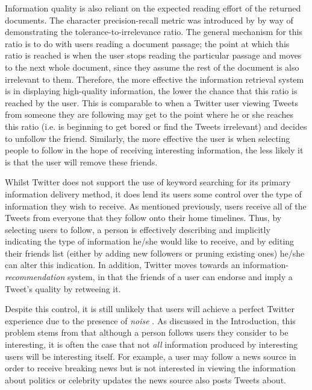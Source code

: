 Information quality is also reliant on the expected reading effort of the returned documents. The character precision-recall metric was introduced by \cite{arvola10} by way of demonstrating the tolerance-to-irrelevance ratio. The general mechanism for this ratio is to do with users reading a document passage; the point at which this ratio is reached is when the user stops reading the particular passage and moves to the next whole document, since they assume the rest of the document is also irrelevant to them. Therefore, the more effective the information retrieval system is in displaying high-quality information, the lower the chance that this ratio is reached by the user. This is comparable to when a Twitter user viewing Tweets from someone they are following may get to the point where he or she reaches this ratio (i.e. is beginning to get bored or find the Tweets irrelevant) and decides to unfollow the friend. Similarly, the more effective the user is when selecting people to follow in the hope of receiving interesting information, the less likely it is that the user will remove these friends.

Whilst Twitter does not support the use of keyword searching for its primary information delivery method, it does lend its users some control over the type of information they wish to receive. As mentioned previously, users receive all of the Tweets from everyone that they follow onto their home timelines. Thus, by selecting users to follow, a person is effectively describing and implicitly indicating the type of information he/she would like to receive, and by editing their friends list (either by adding new followers or pruning existing ones) he/she can alter this indication. In addition, Twitter moves towards an information-\textit{recommendation} system, in that the friends of a user can endorse and imply a Tweet's quality by retweeing it.

Despite this control, it is still unlikely that users will achieve a perfect Twitter experience due to the presence of \textit{noise} \cite{alonso10}. As discussed in the Introduction, this problem stems from that although a person follows users they consider to be interesting, it is often the case that not \textit{all} information produced by interesting users will be interesting itself. For example, a user may follow a news source in order to receive breaking news but is not interested in viewing the information about politics or celebrity updates the news source also posts Tweets about.



